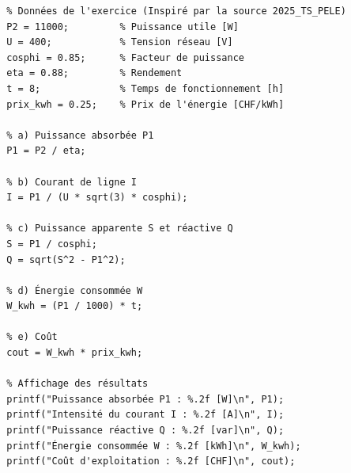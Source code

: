 \documentclass[a4paper,11pt,answers,addpoints]{exam}
\begin{document}
\begin{questions}
\begin{solution}
\begin{verbatim}
		% Données de l'exercice (Inspiré par la source 2025_TS_PELE)
		P2 = 11000;         % Puissance utile [W]
		U = 400;            % Tension réseau [V]
		cosphi = 0.85;      % Facteur de puissance
		eta = 0.88;         % Rendement
		t = 8;              % Temps de fonctionnement [h]
		prix_kwh = 0.25;    % Prix de l'énergie [CHF/kWh]
		
		% a) Puissance absorbée P1
		P1 = P2 / eta;
		
		% b) Courant de ligne I
		I = P1 / (U * sqrt(3) * cosphi);
		
		% c) Puissance apparente S et réactive Q
		S = P1 / cosphi;
		Q = sqrt(S^2 - P1^2);
		
		% d) Énergie consommée W
		W_kwh = (P1 / 1000) * t;
		
		% e) Coût
		cout = W_kwh * prix_kwh;
		
		% Affichage des résultats
		printf("Puissance absorbée P1 : %.2f [W]\n", P1);
		printf("Intensité du courant I : %.2f [A]\n", I);
		printf("Puissance réactive Q : %.2f [var]\n", Q);
		printf("Énergie consommée W : %.2f [kWh]\n", W_kwh);
		printf("Coût d'exploitation : %.2f [CHF]\n", cout);
	\end{verbatim}
\end{solution}
\end{questions}
\end{document}
